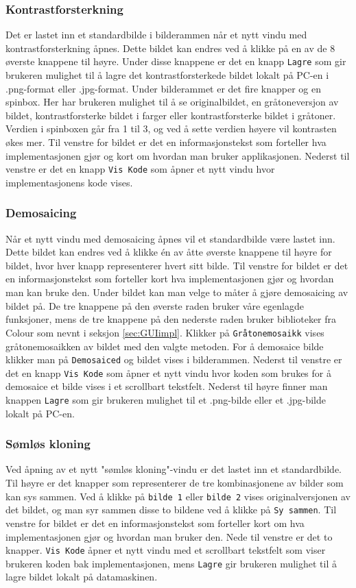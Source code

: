 \subsubsection{Kontrastforsterkning}
Det er lastet inn et standardbilde i bilderammen når et nytt vindu med kontrastforsterkning åpnes. Dette bildet kan endres ved å klikke på en av de 8 øverste knappene til høyre. Under disse knappene er det en knapp \texttt{Lagre} som gir brukeren mulighet til å lagre det kontrastforsterkede bildet lokalt på PC-en i .png-format eller .jpg-format. Under bilderammet er det fire knapper og en spinbox. Her har brukeren mulighet til å se originalbildet, en gråtoneversjon av bildet, kontrastforsterke bildet i farger eller kontrastforsterke bildet i gråtoner. Verdien i spinboxen går fra 1 til 3, og ved å sette verdien høyere vil kontrasten økes mer. Til venstre for bildet er det en informasjonstekst som forteller hva implementasjonen gjør og kort om hvordan man bruker applikasjonen. Nederst til venstre er det en knapp \texttt{Vis Kode} som åpner et nytt vindu hvor implementasjonens kode vises.
\subsubsection{Demosaicing}
Når et nytt vindu med demosaicing åpnes vil et standardbilde være lastet inn. Dette bildet kan endres ved å klikke én av åtte øverste knappene til høyre for bildet, hvor hver knapp representerer hvert sitt bilde. Til venstre for bildet er det en informasjonstekst som forteller kort hva implementasjonen gjør og hvordan man kan bruke den. Under bildet kan man velge to måter å gjøre demosaicing av bildet på. De tre knappene på den øverste raden bruker våre egenlagde funksjoner, mens de tre knappene på den nederste raden bruker biblioteker fra Colour som nevnt i seksjon \ref{sec:GUIimpl}. Klikker på \texttt{Gråtonemosaikk} vises gråtonemosaikken av bildet med den valgte metoden. For å demosaice bilde klikker man på \texttt{Demosaiced} og bildet vises i bilderammen. Nederst til venstre er det en knapp \texttt{Vis Kode} som åpner et nytt vindu hvor koden som brukes for å demosaice et bilde vises i et scrollbart tekstfelt. Nederst til høyre finner man knappen \texttt{Lagre} som gir brukeren mulighet til et .png-bilde eller et .jpg-bilde lokalt på PC-en.

\subsubsection{Sømløs kloning}
Ved åpning av et nytt "sømløs kloning"-vindu er det lastet inn et standardbilde. Til høyre er det knapper som representerer de tre kombinasjonene av bilder som kan sys sammen. Ved å klikke på \texttt{bilde 1} eller \texttt{bilde 2} vises originalversjonen av det bildet, og man syr sammen disse to bildene ved å klikke på \texttt{Sy sammen}. Til venstre for bildet er det en informasjonstekst som forteller kort om hva implementasjonen gjør og hvordan man bruker den. Nede til venstre er det to knapper. \texttt{Vis Kode} åpner et nytt vindu med et scrollbart tekstfelt som viser brukeren koden bak implementasjonen, mens \texttt{Lagre} gir brukeren mulighet til å lagre bildet lokalt på datamaskinen.

